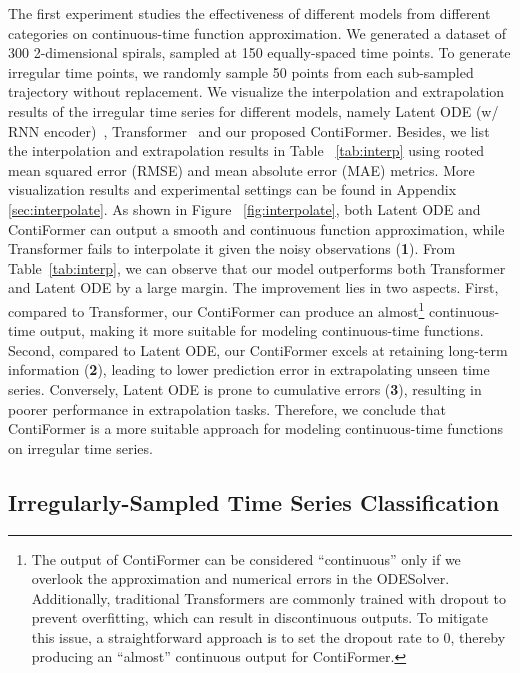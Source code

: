 \documentclass{article}
\begin{document}
The first experiment studies the effectiveness of different models from different categories on continuous-time function approximation.
We generated a dataset of 300 2-dimensional 
spirals, sampled at 150 equally-spaced time points. 
To generate irregular time points, we randomly sample 50 points from each sub-sampled trajectory without replacement. 
We visualize the interpolation and extrapolation results of the irregular time series for different models, namely Latent ODE (w/ RNN encoder)~\cite{chen2018neural}, Transformer~\cite{vaswani2017attention} and our proposed ContiFormer. 
Besides, we list the interpolation and extrapolation results in Table ~\ref{tab:interp} using rooted mean squared error (RMSE) and mean absolute error (MAE) metrics. 
More visualization results and experimental settings can be found in Appendix \ref{sec:interpolate}.
As shown in Figure ~\ref{fig:interpolate}, both Latent ODE and ContiFormer can output a smooth and continuous function approximation, while Transformer fails to interpolate it given the noisy observations (\textcolor[rgb]{0.648, 0.203, 0.476}{\textcircled{\small\textbf{1}}}). 
From Table~\ref{tab:interp}, we can observe that our model outperforms both Transformer and Latent ODE by a large margin. 
The improvement lies in two aspects. 
First, compared to Transformer, our ContiFormer can produce an almost\footnote{The output of ContiFormer can be considered ``continuous'' only if we overlook the approximation and numerical errors in the ODESolver. Additionally, traditional Transformers are commonly trained with dropout to prevent overfitting, which can result in discontinuous outputs. To mitigate this issue, a straightforward approach is to set the dropout rate to 0, thereby producing an ``almost'' continuous output for ContiFormer.} continuous-time output, making it more suitable for modeling continuous-time functions. 
Second, compared to Latent ODE, our ContiFormer excels at retaining long-term information (\textcolor[rgb]{0.296, 0.339, 0.629}{\textcircled{\small\textbf{2}}}), leading to lower prediction error in extrapolating unseen time series. 
Conversely, Latent ODE is prone to cumulative errors (\textcolor[rgb]{1, 0.7617, 0} {\textcircled{\small\textbf{3}}}), resulting in poorer performance in extrapolation tasks. 
Therefore, we conclude that ContiFormer is a more suitable approach for modeling continuous-time functions on irregular time series.


\subsection{Irregularly-Sampled Time Series Classification} \label{istsc}
\end{document}

